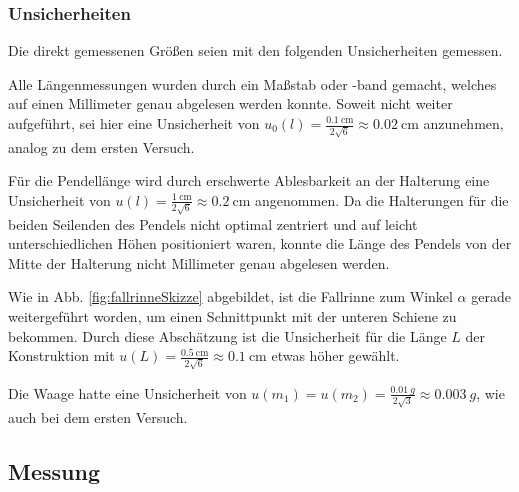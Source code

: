 	\subsubsection*{Unsicherheiten}
	Die direkt gemessenen Größen seien mit den folgenden Unsicherheiten gemessen.
	
	Alle Längenmessungen wurden durch ein Maßstab oder -band gemacht, welches auf einen Millimeter genau abgelesen werden konnte.
	Soweit nicht weiter aufgeführt, sei hier eine Unsicherheit von $u_0(l) = \frac{\SI{0,1}{\centi\meter}}{2\sqrt{6}} \approx \SI{0,02}{\centi\meter}$ anzunehmen, analog zu dem ersten Versuch.
	
	Für die Pendellänge wird durch erschwerte Ablesbarkeit an der Halterung eine Unsicherheit von $u(l) = \frac{\SI{1}{\centi\meter}}{2\sqrt{6}} \approx \SI{0,2}{\centi\meter}$ angenommen.
	Da die Halterungen für die beiden Seilenden des Pendels nicht optimal zentriert und auf leicht unterschiedlichen Höhen positioniert waren, konnte die Länge des Pendels von der Mitte der Halterung nicht Millimeter genau abgelesen werden.
	
 	Wie in Abb. \ref{fig:fallrinneSkizze} abgebildet, ist die Fallrinne zum Winkel $\alpha$ gerade weitergeführt worden, um einen Schnittpunkt mit der unteren Schiene zu bekommen.
	Durch diese Abschätzung ist die Unsicherheit für die Länge $L$ der Konstruktion mit $u(L) = \frac{\SI{0,5}{\centi\meter}}{2\sqrt{6}} \approx \SI{0,1}{\centi\meter}$ etwas höher gewählt.
	
	Die Waage hatte eine Unsicherheit von $u(m_1) = u(m_2) = \frac{\SI{0,01}{g}}{2\sqrt{3}} \approx \SI{0,003}{g}$, wie auch bei dem ersten Versuch.
	
	\subsection{Messung}
	
